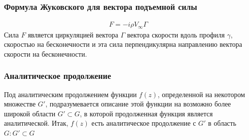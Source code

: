 \documentclass[12pt]{extarticle}
\begin{document}
\subsubsection{Формула Жуковского для вектора подъемной силы}
\begin{eqnarray*}
    F=-i\rho V_{\infty}\Gamma
\end{eqnarray*}
Сила $F$ является циркуляцией вектора $\Gamma$ вектора скорости вдоль
профиля $\gamma$, скоростью на бесконечности и эта сила перпендикулярна
направлению вектора скорости на бесконечности.
\subsubsection{Аналитическое продолжение}
Под аналитическим продолжением функции $f(z)$, определенной на некотором
множестве $G'$, подразумевается описание этой функции на возможно более
широкой области $G'\subset G$, в которой продолженная функция является
аналитической. Итак, $f(z)$ есть аналитическое продолжение с $G'$ в
область $G:G'\subset G$
\end{document}

